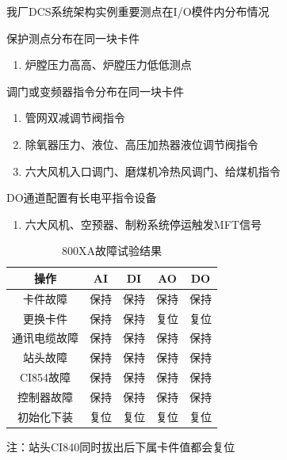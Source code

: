\documentclass[12pt,hyperref={CJKbookmarks=true}]{beamer} %
\begin{document}
\begin{frame}{我厂DCS系统架构实例}{重要测点在I/O模件内分布情况}
\begin{alertblock}{\heiti 保护测点分布在同一块卡件}
			\begin{enumerate}
				\item  炉膛压力高高、炉膛压力低低测点
			
		\end{enumerate}
		\end{alertblock}
\pause
\begin{alertblock}{\heiti 调门或变频器指令分布在同一块卡件}
			\begin{enumerate}
				\item  管网双减调节阀指令
				\item  除氧器压力、液位、高压加热器液位调节阀指令
				\item 六大风机入口调门、磨煤机冷热风调门、给煤机指令
			
		\end{enumerate}
		\end{alertblock}
\begin{alertblock}{\heiti DO通道配置有长电平指令设备}
			\begin{enumerate}
				\item  六大风机、空预器、制粉系统停运触发MFT信号
			
		\end{enumerate}
		\end{alertblock}
\end{frame}
\begin{frame}

\begin{table}
	\caption{800XA故障试验结果}
	\begin{tabular}{|c|c|c|c|c|}
		\hline
		       操作    & AI         & DI     & AO&DO  \\   \hline
		卡件故障    & 保持        & 保持      & 保持&保持  \\  \hline 
		更换卡件    & 保持    & 保持   & 复位&复位\\  \hline  
		通讯电缆故障    & 保持        & 保持      & 保持& 保持 \\   \hline  
		站头故障    &保持          & 保持       & 保持& 保持 \\     \hline
CI854故障    &保持          & 保持       & 保持& 保持 \\     \hline
控制器故障    &保持          & 保持       & 保持& 保持 \\     \hline
初始化下装    &复位          & 复位       & 复位& 复位 \\     \hline
	\end{tabular}
	\end{table}
注：站头CI840同时拔出后下属卡件值都会复位


\end{frame}
\end{document}
